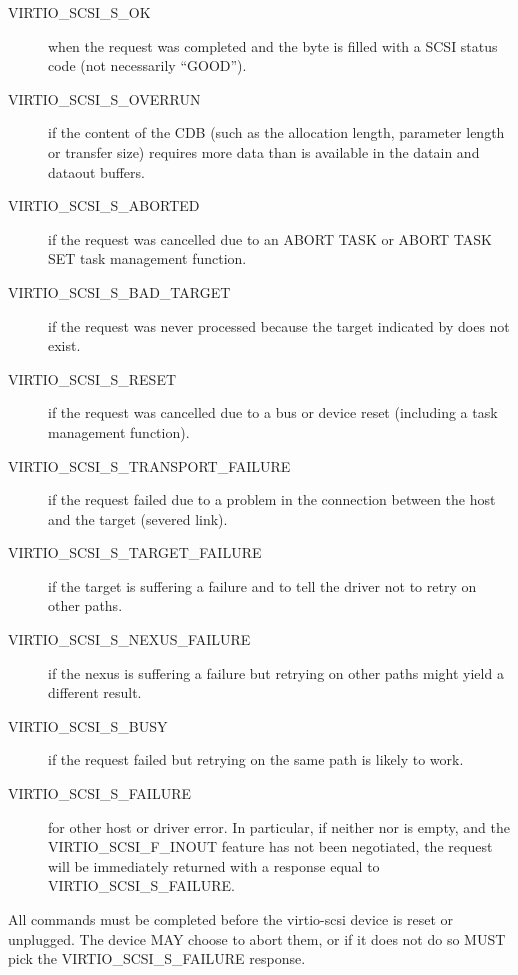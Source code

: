 \begin{description}

\item[VIRTIO_SCSI_S_OK] when the request was completed and the 
  byte is filled with a SCSI status code (not necessarily
  ``GOOD'').

\item[VIRTIO_SCSI_S_OVERRUN] if the content of the CDB (such as the
  allocation length, parameter length or transfer size) requires
  more data than is available in the datain and dataout buffers.

\item[VIRTIO_SCSI_S_ABORTED] if the request was cancelled due to an
  ABORT TASK or ABORT TASK SET task management function.

\item[VIRTIO_SCSI_S_BAD_TARGET] if the request was never processed
  because the target indicated by  does not exist.

\item[VIRTIO_SCSI_S_RESET] if the request was cancelled due to a bus
  or device reset (including a task management function).

\item[VIRTIO_SCSI_S_TRANSPORT_FAILURE] if the request failed due to a
  problem in the connection between the host and the target
  (severed link).

\item[VIRTIO_SCSI_S_TARGET_FAILURE] if the target is suffering a
  failure and to tell the driver not to retry on other paths.

\item[VIRTIO_SCSI_S_NEXUS_FAILURE] if the nexus is suffering a failure
  but retrying on other paths might yield a different result.

\item[VIRTIO_SCSI_S_BUSY] if the request failed but retrying on the
  same path is likely to work.

\item[VIRTIO_SCSI_S_FAILURE] for other host or driver error. In
  particular, if neither  nor  is empty, and the
  VIRTIO_SCSI_F_INOUT feature has not been negotiated, the
  request will be immediately returned with a response equal to
  VIRTIO_SCSI_S_FAILURE.
\end{description}

All commands must be completed before the virtio-scsi device is
reset or unplugged.  The device MAY choose to abort them, or if
it does not do so MUST pick the VIRTIO_SCSI_S_FAILURE response.

